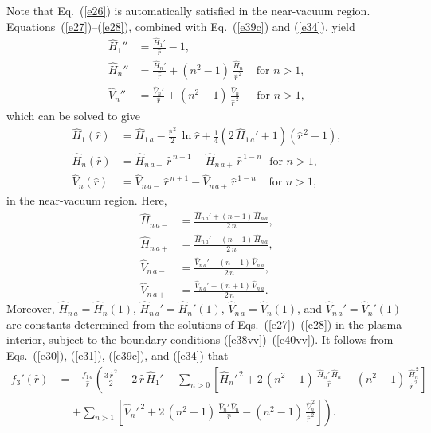 \documentclass[12pt,prb,aps]{revtex4-1}
\begin{document}
Note that Eq.~(\ref{e26}) is automatically satisfied in the near-vacuum region. Equations~(\ref{e27})--(\ref{e28}), combined with Eq.~(\ref{e39c}) and (\ref{e34}), 
yield
\begin{align}\label{e36y}
\hat{H}_1''&= \frac{\hat{H}_1' }{\hat{r}}
-1,\\[0.5ex]
\hat{H}_n''&= \frac{\hat{H}_n'}{\hat{r}}+(n^2-1)\,\frac{\hat{H}_n}{\hat{r}^{\,2}}~~~~~\mbox{for $n>1$},\label{e37}\\[0.5ex]
\hat{V}_n''&= \frac{\hat{V}_n'}{\hat{r}}+(n^2-1)\,\frac{\hat{V}_n}{\hat{r}^{\,2}}~~~~~~\,\mbox{for $n>1$},\label{e38v}
\end{align}
which can be solved to give\,\cite{greene}
\begin{align}
\hat{H}_1(\hat{r}) &= \hat{H}_{1\,a} - \frac{\hat{r}^{\,2}}{2}\,\ln\hat{r} +\frac{1}{4}\left(2\,\hat{H}_{1\,a}'+1\right)(\hat{r}^{\,2}-1) ,\label{e37c}\\[0.5ex]
\hat{H}_n(\hat{r}) &= \hat{H}_{n\,a-}\,\hat{r}^{\,n+1} - \hat{H}_{n\,a+}\,\hat{r}^{\,1-n}~~~\mbox{for $n>1$},\\[0.5ex]
\hat{V}_n(\hat{r}) &= \hat{V}_{n\,a-}\,\hat{r}^{\,n+1} - \hat{V}_{n\,a+}\,\hat{r}^{\,1-n}~~~~~\mbox{for $n>1$},\label{e39cx}
\end{align}
in the near-vacuum region. Here, 
\begin{align}
\hat{H}_{n\,a-}&= \frac{\hat{H}_{n\,a}'+(n-1)\,\hat{H}_{n\,a}}{2\,n},\\[0.5ex]
\hat{H}_{n\,a+} &= \frac{\hat{H}_{n\,a}'-(n+1)\,\hat{H}_{n\,a}}{2\,n},\\[0.5ex]
\hat{V}_{n\,a-}&= \frac{\hat{V}_{n\,a}'+(n-1)\,\hat{V}_{n\,a}}{2\,n},\\[0.5ex]
\hat{V}_{n\,a+} &= \frac{\hat{V}_{n\,a}'-(n+1)\,\hat{V}_{n\,a}}{2\,n}.
\end{align}
Moreover, $\hat{H}_{n\,a}=\hat{H}_n(1)$, $\hat{H}_{n\,a}'=\hat{H}_n'(1)$, $\hat{V}_{n\,a}=\hat{V}_n(1)$,
and $\hat{V}_{n\,a}'=\hat{V}_n'(1)$  are constants determined from the solutions of Eqs.~(\ref{e27})--(\ref{e28}) in the plasma interior,
subject to the boundary conditions (\ref{e38vv})--(\ref{e40vv}).  It follows from Eqs.~(\ref{e30}), (\ref{e31}),  (\ref{e39c}), and (\ref{e34}) that
\begin{align}\label{e58g}
f_3'(\hat{r})& = -\frac{f_{1\,a}}{\hat{r}}\left(\frac{3\,\hat{r}^{\,2}}{2}-2\,\hat{r}\,\hat{H}_1' +\sum_{n>0}\left[\hat{H}_n'^{\,2}+2\,(n^2-1)\,\frac{\hat{H}_n'\,\hat{H}_n}{\hat{r}}-(n^2-1)\,\frac{\hat{H}_n^{\,2}}{\hat{r}^{\,2}}\right]\right.\nonumber\\[0.5ex]
&\phantom{=}\left.+\sum_{n>1}\left[\hat{V}_n'^{\,2}+2\,(n^2-1)\,\frac{\hat{V}_n'\,\hat{V}_n}{\hat{r}}-(n^2-1)\,\frac{\hat{V}_n^{\,2}}{\hat{r}^{\,2}}\right]
\right).
\end{align}
\end{document}

